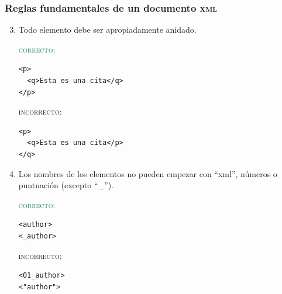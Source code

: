 \documentclass[%
  handout, %
  ]{beamer}
\newcommand*{\rojo}[1]{\textcolor[HTML]{8B0000}{#1}}
\newcommand*{\verde}[1]{\textcolor{seagreen}{#1}}
\newcommand*{\XML}{\textsc{xml}}
\begin{document}
\begin{frame}[fragile]
  \frametitle{Reglas fundamentales de un documento \XML}
  \begin{enumerate}
      \setcounter{enumi}{2}
    \item Todo elemento debe ser apropiadamente anidado.

      \medskip

      \begin{minipage}{0.4\linewidth}
      \verde{\textsc{correcto}:}
\begin{verbatim}
<p>
  <q>Esta es una cita</q>
</p>

\end{verbatim}        
    \end{minipage}%
      \hfill%
      \begin{minipage}{0.5\linewidth}
   \rojo{\textsc{incorrecto}:}
\begin{verbatim}
<p>
  <q>Esta es una cita</p>
</q>

\end{verbatim}
      \end{minipage}%
      
    \item Los nombres de los elementos no pueden empezar con \enquote{xml}, números o puntuación (excepto \enquote{\_}).

      \medskip
      
      \begin{minipage}{0.4\linewidth}
      \verde{\textsc{correcto}:}
\begin{verbatim}
<author>
<_author>
\end{verbatim}        
    \end{minipage}%
      \hfill%
      \begin{minipage}{0.5\linewidth}
   \rojo{\textsc{incorrecto}:}
\begin{verbatim}
<01_author>
<"author">
\end{verbatim}
      \end{minipage}%
  \end{enumerate}
\end{frame}
\end{document}
